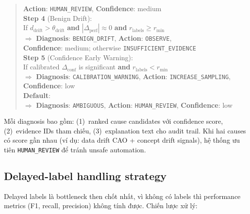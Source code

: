 \documentclass[11pt,a4paper]{article}
\begin{document}
\begin{quote}
  \hspace*{1em}\textbf{Action}: \texttt{HUMAN\_REVIEW}, \textbf{Confidence}: medium\\[0.3em]
\textbf{Step 4} (Benign Drift):\\
\hspace*{1em}If $d_\text{drift} > \theta_\text{drift}$ \textbf{and} $|\Delta_\text{perf}| \approx 0$ \textbf{and} $r_\text{labels} \ge r_\text{min}$\\
  \hspace*{1em}$\Rightarrow$ \textbf{Diagnosis}: \texttt{BENIGN\_DRIFT}, \textbf{Action}: \texttt{OBSERVE},\\
  \hspace*{1em}\textbf{Confidence}: medium; otherwise \texttt{INSUFFICIENT\_EVIDENCE}\\[0.3em]
\textbf{Step 5} (Confidence Early Warning):\\
\hspace*{1em}If calibrated $\Delta_\text{conf}$ is significant \textbf{and} $r_\text{labels} < r_\text{min}$\\
  \hspace*{1em}$\Rightarrow$ \textbf{Diagnosis}: \texttt{CALIBRATION\_WARNING}, \textbf{Action}: \texttt{INCREASE\_SAMPLING}, \textbf{Confidence}: low\\[0.3em]
\textbf{Default}:\\
  \hspace*{1em}$\Rightarrow$ \textbf{Diagnosis}: \texttt{AMBIGUOUS}, \textbf{Action}: \texttt{HUMAN\_REVIEW}, \textbf{Confidence}: low
\end{quote}

Mỗi diagnosis bao gồm: (1)~ranked cause candidates với confidence score, (2)~evidence IDs tham chiếu, (3)~explanation text cho audit trail. Khi hai causes có score gần nhau (ví dụ: data drift CAO + concept drift signals), hệ thống ưu tiên \texttt{HUMAN\_REVIEW} để tránh unsafe automation.

\subsection{Delayed-label handling strategy}\label{subsec:delayed-labels}

Delayed labels là bottleneck then chốt nhất, vì không có labels thì performance metrics (F1, recall, precision) không tính được. Chiến lược xử lý:
\end{document}
